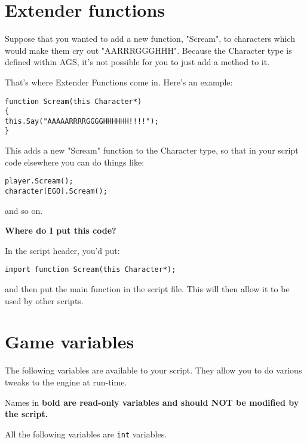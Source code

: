 \section{Extender functions}\label{ExtenderFunctions}%

Suppose that you wanted to add a new function, "Scream", to characters which would make
them cry out "AARRRGGGHHH". Because the Character type is defined within AGS, it's not
possible for you to just add a method to it.

That's where Extender Functions come in. Here's an example:
\begin{verbatim}
function Scream(this Character*)
{
this.Say("AAAAARRRRGGGGHHHHHH!!!!");
}
\end{verbatim}
This adds a new "Scream" function to the Character type, so that in your script code
elsewhere you can do things like:
\begin{verbatim}
player.Scream();
character[EGO].Scream();
\end{verbatim}
and so on.

\bf{Where do I put this code?}

In the script header, you'd put:

\verb$import function Scream(this Character*);$

and then put the main function in the script file. This will then allow it to be used
by other scripts.


\section{Game variables}\label{Gamevariables}%

The following variables are available to your script. They allow you to do various tweaks
to the engine at run-time.

Names in \bf{bold} are \bf{read-only variables} and should NOT be modified by the script.

All the following variables are \verb$int$ variables.

